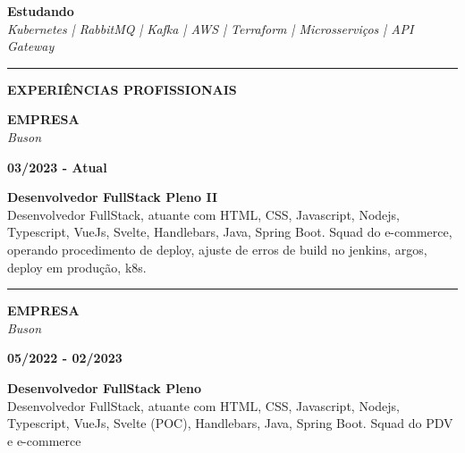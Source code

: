 \documentclass[12pt, a4paper]{article}
\newcommand{\LlinhaG}{2pt} %
\newcommand{\TlinhaG}{17cm}  %
\newcommand{\LlinhaM}{1pt} 	 %
\newcommand{\TlinhaM}{17cm}		 %
\begin{document}
\begin{multicols}{2}
	\begin{flushleft}
		\textbf{Estudando}\\
		\textit{Kubernetes | RabbitMQ | Kafka | AWS | Terraform | Microsserviços | API Gateway }\\
	\end{flushleft}
	\vfill
	\begin{flushleft}

	\end{flushleft}
\end{multicols}

\clearpage

\begin{center}	%
	\rule{\TlinhaG}{\LlinhaG}
\end{center}

\begin{center}
	\textbf{EXPERIÊNCIAS PROFISSIONAIS}\\
\end{center}

\begin{multicols}{2}
	\begin{flushleft}
		\textbf{EMPRESA}\\
		\textit{Buson}\\
	\end{flushleft}
	\vfill
	\begin{flushright}
		\textbf{03/2023 - Atual}\\
	\end{flushright}
\end{multicols}
\begin{flushleft}
	\textbf{Desenvolvedor FullStack Pleno II}\\
	Desenvolvedor FullStack, atuante com HTML, CSS, Javascript, Nodejs, Typescript, VueJs, Svelte, Handlebars,
	Java, Spring Boot. Squad  do e-commerce, operando procedimento de deploy, ajuste de erros de build no jenkins, argos, deploy em produção, k8s.
\end{flushleft}

\begin{center} %
	\rule{\TlinhaM}{\LlinhaM}
\end{center}

\begin{multicols}{2}
	\begin{flushleft}
		\textbf{EMPRESA}\\
		\textit{Buson}\\
	\end{flushleft}
	\vfill
	\begin{flushright}
		\textbf{05/2022 - 02/2023}\\
	\end{flushright}
\end{multicols}
\begin{flushleft}
	\textbf{Desenvolvedor FullStack Pleno}\\
	Desenvolvedor FullStack, atuante com HTML, CSS, Javascript, Nodejs, Typescript, VueJs, Svelte (POC), Handlebars,
	Java, Spring Boot. Squad do PDV e e-commerce
\end{flushleft}
\end{document}
